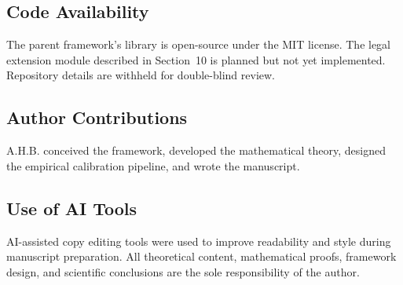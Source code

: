 \documentclass[12pt]{article}
\begin{document}
\subsection*{Code Availability}
The parent framework's library is open-source under the MIT license. The legal extension module described in Section~10 is planned but not yet implemented. Repository details are withheld for double-blind review.

\subsection*{Author Contributions}
A.H.B. conceived the framework, developed the mathematical theory, designed the empirical calibration pipeline, and wrote the manuscript.

\subsection*{Use of AI Tools}
AI-assisted copy editing tools were used to improve readability and style during manuscript preparation. All theoretical content, mathematical proofs, framework design, and scientific conclusions are the sole responsibility of the author.
\end{document}
